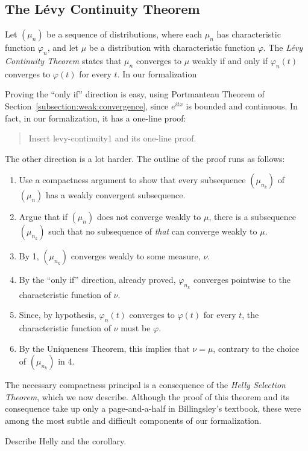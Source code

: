 \documentclass{svjour3}
\newcommand{\todo}[1]{{\color{red}#1}}
\newcommand{\ph}{\varphi}
\begin{document}
\subsection{The L\'evy Continuity Theorem}

Let $(\mu_n)$ be a sequence of distributions, where each $\mu_n$ has characteristic function $\ph_n$, and let $\mu$ be a distribution with characteristic function $\ph$. The \emph{L\'evy Continuity Theorem} states that $\mu_n$ converges to $\mu$ weakly if and only if $\ph_n(t)$ converges to $\ph(t)$ for every $t$. In our formalization

Proving the ``only if'' direction is easy, using Portmanteau Theorem of Section~\ref{subsection:weak:convergence}, since $e^{itx}$ is bounded and continuous. In fact, in our formalization, it has a one-line proof:
\begin{quote}
 \todo{Insert levy-continuity1 and its one-line proof.}
\end{quote}
The other direction is a lot harder. The outline of the proof runs as follows:
\begin{enumerate}
 \item Use a compactness argument to show that every subsequence $(\mu_{n_k})$ of $(\mu_n)$ has a weakly convergent subsequence.
 \item Argue that if $(\mu_n)$ does not converge weakly to $\mu$, there is a subsequence $(\mu_{n_k})$ such that no subsequence of \emph{that} can converge weakly to $\mu$.
 \item By 1, $(\mu_{n_k})$ converges weakly to some measure, $\nu$. 
 \item By the ``only if'' direction, already proved, $\ph_{n_k}$ converges pointwise to the characteristic function of $\nu$.
 \item Since, by hypothesis, $\ph_n(t)$ converges to $\ph(t)$ for every $t$, the characteristic function of $\nu$ must be $\ph$.
 \item By the Uniqueness Theorem, this implies that $\nu = \mu$, contrary to the choice of $(\mu_{n_k})$ in 4.
\end{enumerate}

The necessary compactness principal is a consequence of the \emph{Helly Selection Theorem}, which we now describe. Although the proof of this theorem and its consequence take up only a page-and-a-half in Billingsley's textbook, these were among the most subtle and difficult components of our formalization.

\todo{Describe Helly and the corollary.}
\end{document}
